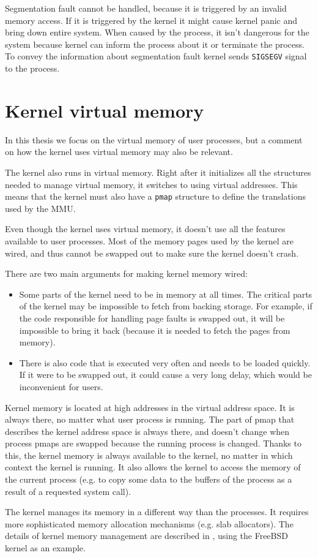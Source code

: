 Segmentation fault cannot be handled, because it is triggered by an invalid memory access.
If it is triggered by the kernel it might cause kernel panic and bring down entire system.
When caused by the process, it isn't dangerous for the system because kernel can inform the process about it or terminate the process.
To convey the information about segmentation fault kernel sends \texttt{SIGSEGV} signal to the process.

\section{Kernel virtual memory}

In this thesis we focus on the virtual memory of user processes,
but a comment on how the kernel uses virtual memory may also be relevant.

The kernel also runs in virtual memory.
Right after it initializes all the structures needed to manage virtual memory, it switches to using virtual addresses.
This means that the kernel must also have a \texttt{pmap} structure to define the translations used by the MMU.

Even though the kernel uses virtual memory, it doesn't use all the features available to user processes.
Most of the memory pages used by the kernel are wired, and thus cannot be swapped out to make sure the kernel doesn't crash.

There are two main arguments for making kernel memory wired:
\begin{itemize}
  \item Some parts of the kernel need to be in memory at all times.
    The critical parts of the kernel may be impossible to fetch from backing storage.
    For example, if the code responsible for handling page faults is swapped out,
    it will be impossible to bring it back (because it is needed to fetch the pages from memory).
  \item There is also code that is executed very often and needs to be loaded quickly.
    If it were to be swapped out, it could cause a very long delay, which would be inconvenient for users.
\end{itemize}

Kernel memory is located at high addresses in the virtual address space.
It is always there, no matter what user process is running.
The part of pmap that describes the kernel address space is always there,
and doesn't change when process pmaps are swapped because the running process is changed.
Thanks to this, the kernel memory is always available to the kernel, no matter in which context the kernel is running.
It also allows the kernel to access the memory of the current process
(e.g. to copy some data to the buffers of the process as a result of a requested system call).

The kernel manages its memory in a different way than the processes.
It requires more sophisticated memory allocation mechanisms (e.g. slab allocators).
The details of kernel memory management are described in \cite{mckusick}, using the FreeBSD kernel as an example.

